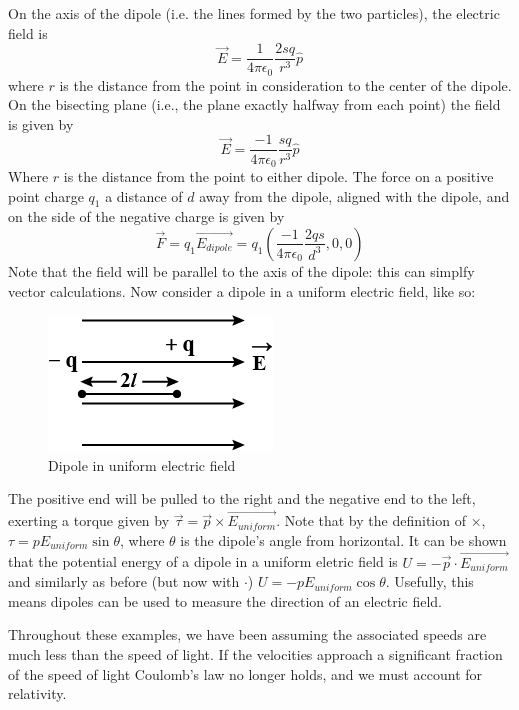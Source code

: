 \documentclass[nobib]{tufte-handout}
\begin{document}
On the axis of the dipole (i.e. the lines
formed by the two particles), the electric field is 
\[\vec{E} = \frac{1}{4\pi \epsilon_0}\frac{2sq}{r^3}\hat{p}\]
where $r$ is the distance from the point in consideration to the
center of the dipole.
On the bisecting plane (i.e., the plane exactly halfway from each 
point) the field is given by
\[\vec{E} = \frac{-1}{4 \pi \epsilon_0}\frac{sq}{r^3}\hat{p}\]
Where $r$ is the distance from the point to either dipole.
The force on a positive point charge $q_1$ a 
distance of $d$ away from the dipole, aligned with the dipole, and 
on the side of the negative charge is given by 
\[\vec{F}=q_1\vec{E_{dipole}}=q_1(\frac{-1}{4\pi \epsilon_0}\frac{2qs}{d^3},0,0)\]
Note that the field will be parallel to the axis of the dipole: this 
can simplfy vector calculations.
Now consider a dipole in a uniform electric field, like so:
\begin{figure}
    \caption{Dipole in uniform electric field}
    \center
    \includegraphics[width=\textwidth /2]{images/dipoleinuniformelectricfield.png}
\end{figure}
The positive end will be pulled to the right and the negative 
end to the left, exerting a torque given by $\vec{\tau} = \vec{p} \times \vec{E_{uniform}}$.
Note that by the definition of $\times$, $\tau = p E_{uniform} \sin{\theta}$, where $\theta$ is the
dipole's angle from horizontal. It can be shown that the potential
energy of a dipole in a uniform eletric field is $U = -\vec{p} \cdot \vec{E_{uniform}}$
and similarly as before (but now with $\cdot$) $U = -p E_{uniform} \cos{\theta}$. Usefully,
this means dipoles can be used to measure the direction of an electric field. 

Throughout these examples, we have been assuming the associated 
speeds are much less than the speed of light. If the velocities
approach a significant fraction of the speed of light Coulomb's
law no longer holds, and we must account for relativity. 
\end{document}
